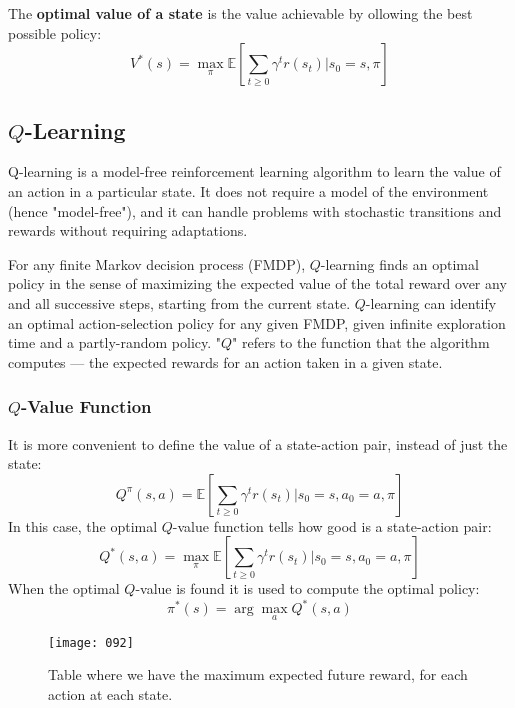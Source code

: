 The \textbf{optimal value of a state} is the value achievable by ollowing the best possible policy:
\begin{equation}
    V^*(s) = \max_\pi \mathbb{E} \left[
        \sum_{t \geq 0} \gamma^t r(s_t) | s_0 = s, \pi
    \right]
\end{equation}

\subsection{\(Q\)-Learning}
Q-learning is a model-free reinforcement learning algorithm to learn the value of an action in a particular state. It does not require a model of the environment (hence "model-free"), and it can handle problems with stochastic transitions and rewards without requiring adaptations.

For any finite Markov decision process (FMDP), \(Q\)-learning finds an optimal policy in the sense of maximizing the expected value of the total reward over any and all successive steps, starting from the current state. \(Q\)-learning can identify an optimal action-selection policy for any given FMDP, given infinite exploration time and a partly-random policy. "\(Q\)" refers to the function that the algorithm computes --- the expected rewards for an action taken in a given state.

\subsubsection{\(Q\)-Value Function}
It is more convenient to define the value of a state-action pair, instead of just the state:
\begin{equation}
    Q^\pi (s,a) = \mathbb{E} \left[
        \sum_{t \geq 0} \gamma^t r(s_t) | s_0 = s, a_0 = a, \pi
    \right]
\end{equation}
In this case, the optimal \(Q\)-value function tells how good is a state-action pair:
\begin{equation}
    Q^* (s,a) = \max_\pi \mathbb{E} \left[
        \sum_{t \geq 0} \gamma^t r(s_t) | s_0 = s, a_0 = a, \pi
    \right]
\end{equation}
When the optimal \(Q\)-value is found it is used to compute the optimal policy:
\begin{equation}
    \pi^* (s) = \arg \max_a Q^* (s,a)
\end{equation}
\begin{figure}[h!]
    \centering
    \texttt{[image: 092]}
    \caption{Table where we have the maximum expected future reward, for each action at each state.}
    \label{fig:092}
\end{figure}


